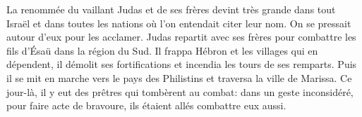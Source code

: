 La renommée du vaillant Judas et de ses frères devint très grande dans tout Israël
	et dans toutes les nations où l’on entendait citer leur nom.
	On se pressait autour d’eux pour les acclamer.
Judas repartit avec ses frères pour combattre les fils d’Ésaü dans la région du Sud.
	Il frappa Hébron et les villages qui en dépendent,
	il démolit ses fortifications et incendia les tours de ses remparts.
Puis il se mit en marche vers le pays des Philistins et traversa la ville de Marissa.
Ce jour-là, il y eut des prêtres qui tombèrent au combat:
	dans un geste inconsidéré, pour faire acte de bravoure,
	ils étaient allés combattre eux aussi.